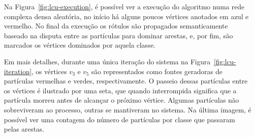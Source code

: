 \begin{figure}[!h]
\centering
    \captionsetup{width=14.8cm}

    \begin{subfigure}[b]{0.45\textwidth}
    \centering
    \caption{\label{fig:lcu-partial}}
    \end{subfigure}
\quad
    \begin{subfigure}[b]{0.45\textwidth}
    \centering
    \caption{\label{fig:lcu-done}}
    \end{subfigure}
    {\Fonte{\fonteautor}}
\quad
\end{figure}
\FloatBarrier{}


Na Figura~\ref{fig:lcu-execution}, é possível ver a execução do
algoritmo numa rede complexa densa aleatória, no início há alguns
poucos vértices anotados em azul e vermelho. No final da execução os
rótulos são propagados semanticamente baseado na disputa entre as
partículas para dominar arestas, e, por fim, são marcados os vértices
dominados por aquela classe.

Em mais detalhes, durante uma única iteração do sistema na
Figura~\ref{fig:lcu-iteration}, os vértices $v_3$ e $v_5$ são
representados como fontes geradoras de partículas vermelhas e verdes,
respectivamente. O passeio dessas partículas entre os vértices é
ilustrado por uma seta, que quando interrompida significa que a
partícula morreu antes de alcançar o próximo vértice. Algumas
partículas não sobreviveram ao processo, outras se mantiveram no
sistema. Na última imagem, é possível ver uma contagem do número de
partículas por classe que passaram pelas arestas.


